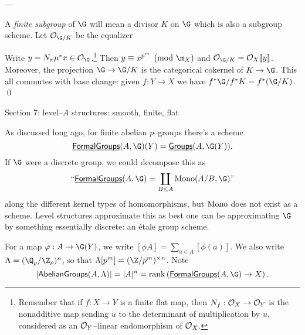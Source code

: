 ---

\begin{definition}
A \textit{finite subgroup} of $\G$ will mean a divisor $K$ on $\G$ which is also a subgroup scheme.  Let $\sheaf{O}_{\G/K}$ be the equalizer
\begin{center}
\end{center}
\end{definition}

\begin{lemma}
Write $y = N_\pi \mu^* x \in \sheaf O_{\G}$.\footnote{Remember that if $f: X \to Y$ is a finite flat map, then $N_f: \mathcal{O}_X \to \mathcal{O}_Y$ is the nonadditive map sending $u$ to the determinant of multiplication by $u$, considered as an $\mathcal{O}_Y$--linear endomorphism of $\mathcal{O}_X$.}  Then $y \equiv x^{p^m} \pmod{\m_X}$ and $\sheaf O_{\G/K} = \sheaf O_X\ps{y}$.  Moreover, the projection $\G \to \G/K$ is the categorical cokernel of $K \to \G$.  This all commutes with base change: given $f: Y \to X$ we have $f^* \G / f^* K = f^*(\G/K)$. \qed {}
\end{lemma}

Section 7: level--$A$ structures: smooth, finite, flat

As discussed long ago, for finite abelian $p$--groups there's a scheme \[\InternalHom{FormalGroups}(A, \G)(Y) = \InternalHom{Groups}(A, \G(Y)).\]  If $\G$ were a discrete group, we could decompose this as \[\text{``$\InternalHom{FormalGroups}(A, \G) = \coprod_{B \le A} \Mono(A/B, \G)$''}\] along the different kernel types of homomorphisms, but $\operatorname{Mono}$ does not exist as a scheme.  Level structures approximate this as best one can be approximating $\G$ by something essentially discrete: an \'etale group scheme.

For a map $\phi: A \to \G(Y)$, we write $[\phi A] = \sum_{a \in A}[\phi(a)]$.  We also write $\Lambda = (\Q_p / \Z_p)^n$, so that $\Lambda[p^m] = (\Z/p^m)^{\times n}$.  Note \[|\CatOf{AbelianGroups}(A, \Lambda)| = |A|^n = \operatorname{rank} \left( \InternalHom{FormalGroups}(A, \G) \to X \right).\]

